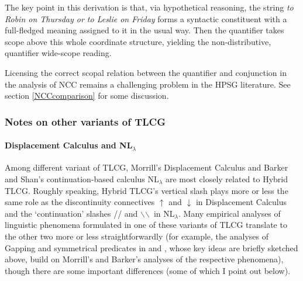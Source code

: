 \documentclass[output=paper]{langsci/langscibook}
\begin{document}
\noindent The key point in this derivation is that, via hypothetical
reasoning, the string \textit{to Robin on Thursday or to Leslie on Friday}
forms a syntactic constituent with a full-fledged meaning assigned to
it in the usual way. Then the quantifier takes scope above this whole
coordinate structure, yielding the non-distributive, quantifier
wide-scope reading.

Licensing the correct scopal relation between the quantifier and
conjunction in the analysis of NCC remains a challenging problem in
the HPSG literature. See section \ref{NCCcomparison} for some
discussion.


\subsubsection{Notes on other variants of TLCG \label{sec:comparison}}

\paragraph{Displacement Calculus and NL\ensuremath{_\lambda} \label{disp}}

Among different variant of TLCG, Morrill's Displacement Calculus and
Barker and Shan's continuation-based calculus NL\ensuremath{_\lambda} are most closely
related to Hybrid TLCG. Roughly speaking, Hybrid TLCG's vertical slash \syncat{\ensuremath{\vs}} plays more
or less the same role as the discontinuity connectives $\uparrow$ and
$\downarrow$ in Displacement Calculus and the `continuation' slashes
// and \ensuremath{\backslash}\ensuremath{\backslash}\ in NL\ensuremath{_\lambda}. Many empirical analyses of linguistic
phenomena formulated in one of these variants of TLCG translate to the
other two more or less straightforwardly (for example, the analyses of
Gapping and symmetrical predicates in \citet{kubota-levine-gapping} and
\citet{kubota-levine-resp}, whose key ideas are briefly sketched above,
build on Morrill's and Barker's analyses of the respective phenomena),
though there are some important differences (some of which I point out
below).
\end{document}

